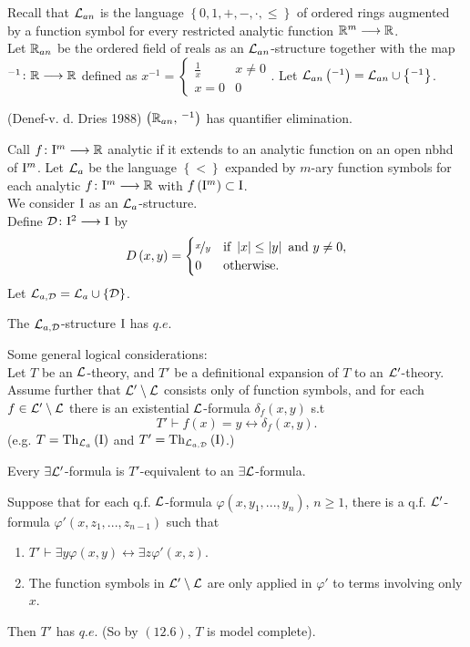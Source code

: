 Recall that $\mathcal{L}_{an}$ is the language $\left\{ 0,1,+,-,\cdot,\leq\right\} $
of ordered rings augmented by a function symbol for every restricted
analytic function $\mathbb{R}^{m}\longrightarrow\mathbb{R}$. \\
Let $\mathbb{R}_{an}$ be the ordered field of reals as an $\mathcal{L}_{an}$-structure
together with the map $^{-1}\colon\mathbb{R}\longrightarrow\mathbb{R}$ defined as $x^{-1}=\begin{cases}
\frac{1}{x} & x\neq0\\
x=0 & 0
\end{cases}$. Let $\mathcal{L}_{an}\left(^{-1}\right)=\mathcal{L}_{an}\cup\left\{ ^{-1}\right\} $.
\begin{thm*}
\label{12.1} (Denef-v. d. Dries 1988) $\left(\mathbb{R}_{an},\,^{-1}\right)$ has
quantifier elimination.
\end{thm*}
Call $f\colon\mathrm{I}^{m}\longrightarrow\mathbb{R}$ analytic if it extends to an analytic
function on an open nbhd of $\mathrm{I}^{m}$. Let $\mathcal{L}_{a}$ be the language
$\left\{ <\right\} $ expanded by $m$-ary function symbols for each
analytic $f\colon\mathrm{I}^{m}\longrightarrow\mathbb{R}$ with $f\left(\mathrm{I}^{m}\right)\subset\mathrm{I}$.\\
We consider $\mathrm{I}$ as an $\mathcal{L}_{a}$-structure.\\
Define $\mathcal{D}\colon\mathrm{I}^{2}\longrightarrow\mathrm{I}$ by
\[
D\left(x,y\right)=\begin{cases}
\nicefrac{x}{y} & \textrm{if }\left|x\right|\leq\left|y\right|\textrm{ and }y\neq0,\\
0 & \textrm{otherwise.}
\end{cases}
\]
Let $\mathcal{L}_{a,\mathcal{D}}=\mathcal{L}_{a}\cup\left\{ \mathcal{D}\right\} $.
\begin{thm*}
\label{12.2} The $\mathcal{L}_{a,\mathcal{D}}$-structure $\mathrm{I}$ has $q.e.$
\end{thm*}
Some general logical considerations:\\
Let $T$ be an $\mathcal{L}$-theory, and $T'$ be a definitional expansion
of $T$ to an $\mathcal{L}'$-theory. Assume further that $\mathcal{L}'\setminus\mathcal{L}$
consists only of function symbols, and for each $f\in\mathcal{L}'\setminus\mathcal{L}$
there is an existential $\mathcal{L}$-formula $\delta_{f}\left(x,y\right)$
s.t 
\[
T'\vdash f\left(x\right)=y\longleftrightarrow\delta_{f}\left(x,y\right).
\]
(e.g. $T=\mathrm{Th}_{\mathcal{L}_{a}}\left(\mathrm{I}\right)$ and $T'=\mathrm{Th}_{\mathcal{L}_{a,\mathcal{D}}}\left(\mathrm{I}\right)$.)
\begin{lem*}
\label{12.6} Every $\exists\mathcal{L}'$-formula is $T'$-equivalent to an $\exists\mathcal{L}$-formula.
\begin{lem*}
\label{12.7} Suppose that for each q.f. $\mathcal{L}$-formula $\varphi\left(x,y_{1},...,y_{n}\right)$,
$n\geq1$, there is a q.f. $\mathcal{L}'$-formula $\varphi'$$\left(x,z_{1},...,z_{n-1}\right)$
such that 
\begin{enumerate}
\item $T'\vdash\exists y\varphi\left(x,y\right)\longleftrightarrow\exists z\varphi'\left(x,z\right)$.
\item The function symbols in $\mathcal{L}'\setminus\mathcal{L}$ are only applied in $\varphi'$
to terms involving only $x$.
\end{enumerate}
\end{lem*}
Then $T'$ has $q.e$. (So by $\left(12.6\right)$, $T$ is model
complete).
\end{lem*}
